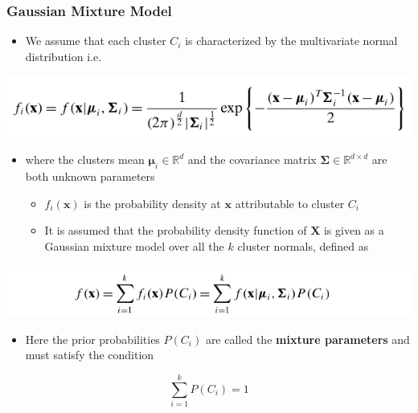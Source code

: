 \documentclass[11pt]{article}
\begin{document}
\subsubsection{Gaussian Mixture Model}
\label{sec:org49283a1}
\begin{itemize}
\item We assume that each cluster \(C_i\) is characterized by the multivariate normal distribution i.e.
\end{itemize}
\begin{center}
\includegraphics[width=.9\linewidth]{Representative-based Clustering/screenshot_2018-11-27_19-30-49.png}
\end{center}
\begin{itemize}
\item where the clusters mean \(\pmb \mu_i \in \mathbb R^d\) and the covariance matrix \(\mathbf \Sigma \in \mathbb R^{d \times d}\) are both unknown parameters
\begin{itemize}
\item \(f_i(\pmb x)\) is the probability density at \(\pmb x\) attributable to cluster \(C_i\)
\item It is assumed that the probability density function of \(\mathbf X\) is given as a Gaussian mixture model over all the \(k\) cluster normals, defined as
\end{itemize}
\end{itemize}
\begin{center}
\includegraphics[width=.9\linewidth]{Representative-based Clustering/screenshot_2018-11-27_19-34-13.png}
\end{center}
\begin{itemize}
\item Here the prior probabilities \(P(C_i)\) are called the \textbf{mixture parameters} and must satisfy the condition
\end{itemize}
\begin{equation}
  \sum_{i=1}^kP(C_i) = 1
\end{equation}
\end{document}
